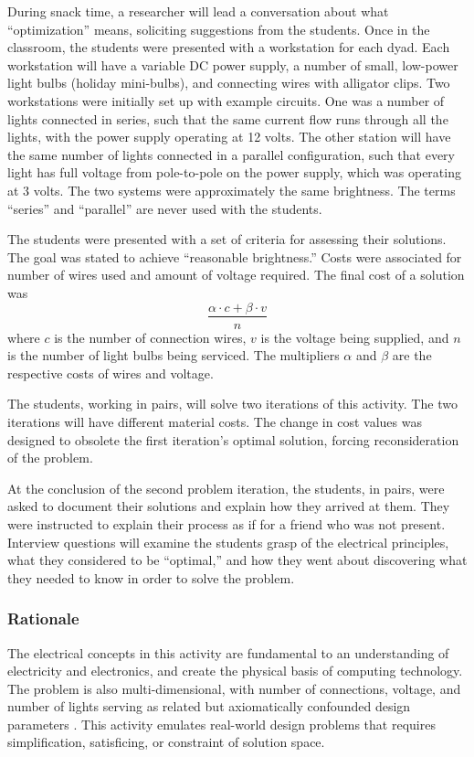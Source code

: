 	During snack time, a researcher will lead a conversation about what
	{}``optimization'' means, soliciting suggestions from the students.
	Once in the classroom, the students were presented with a workstation
	for each dyad. Each workstation will have a variable DC power supply,
	a number of small, low-power light bulbs (holiday mini-bulbs), and
	connecting wires with alligator clips. Two workstations were initially
	set up with example circuits. One was a number of lights connected
	in series, such that the same current flow runs through all the lights,
	with the power supply operating at 12 volts. The other station will
	have the same number of lights connected in a parallel configuration,
	such that every light has full voltage from pole-to-pole on the power
	supply, which was operating at 3 volts. The two systems were
	approximately the same brightness. The terms {}``series'' and {}``parallel''
	are never used with the students.
	
	The students were presented with a set of criteria for assessing
	their solutions. The goal was stated to achieve {}``reasonable
	brightness.'' Costs were associated for number of wires used and
	amount of voltage required. The final cost of a solution was \[
	\frac{\alpha\cdot c+\beta\cdot v}{n}\]
	where $c$ is the number of connection wires, $v$ is the voltage
	being supplied, and $n$ is the number of light bulbs being serviced.
	The multipliers $\alpha$ and $\beta$ are the respective costs of
	wires and voltage.
	
	The students, working in pairs, will solve two iterations of this
	activity. The two iterations will have different material costs. The
	change in cost values was designed to obsolete the first iteration's
	optimal solution, forcing reconsideration of the problem.
	
	At the conclusion of the second problem iteration, the students, in
	pairs, were asked to document their solutions and explain how they
	arrived at them. They were instructed to explain their process
	as if for a friend who was not present. Interview questions will examine
	the students grasp of the electrical principles, what they considered
	to be {}``optimal,'' and how they went about discovering what they
	needed to know in order to solve the problem.
	
	
	\subsubsection{Rationale}
	
	The electrical concepts in this activity are fundamental to an understanding
	of electricity and electronics, and create the physical basis of computing
	technology. The problem is also multi-dimensional, with number of
	connections, voltage, and number of lights serving as related but
	axiomatically confounded design parameters \citet{axiomatic}. This
	activity emulates real-world design problems that requires simplification,
	satisficing, or constraint of solution space.


